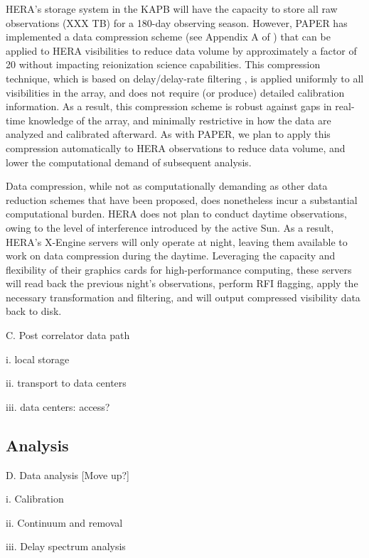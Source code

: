 \documentclass[preprint]{aastex}
\begin{document}
HERA's storage system in the KAPB will have the capacity to store all raw observations
(XXX TB) for a 180-day observing season.  However, PAPER has implemented a data compression
scheme (see Appendix A of \citealt{parsons_et_al2013}) that can be applied to HERA visibilities
to reduce data volume by approximately a factor of 20 without impacting reionization science capabilities.
This compression technique, which is based on delay/delay-rate filtering \citep{parsons_backer2009},
is applied uniformly to all visibilities in the array, and does not require (or produce) detailed 
calibration information.  As a result, this compression scheme is robust against gaps in
real-time knowledge of the array, and minimally restrictive in how the data
are analyzed and calibrated afterward.  As with PAPER, we plan to apply this compression
automatically to HERA observations to reduce data volume, and lower the computational demand
of subsequent analysis.

Data compression, while not as computationally demanding as other data reduction schemes
that have been proposed, does nonetheless incur a substantial computational burden.
HERA does not plan to conduct daytime observations, owing to the level of interference
introduced by the active Sun.  As a result, HERA's X-Engine servers will only operate
at night, leaving them available to work on data compression during the
daytime.  Leveraging the capacity and flexibility of their graphics cards for high-performance
computing, these servers will read back the previous night's observations, perform RFI flagging,
apply the necessary transformation and filtering, and will output compressed visibility data
back to disk.


C. Post correlator data path

i. local storage

ii. transport to data centers

iii. data centers: access? 

\subsection{Analysis}
D. Data analysis [Move up?]

i. Calibration 

ii. Continuum and removal

iii. Delay spectrum analysis
\end{document}
